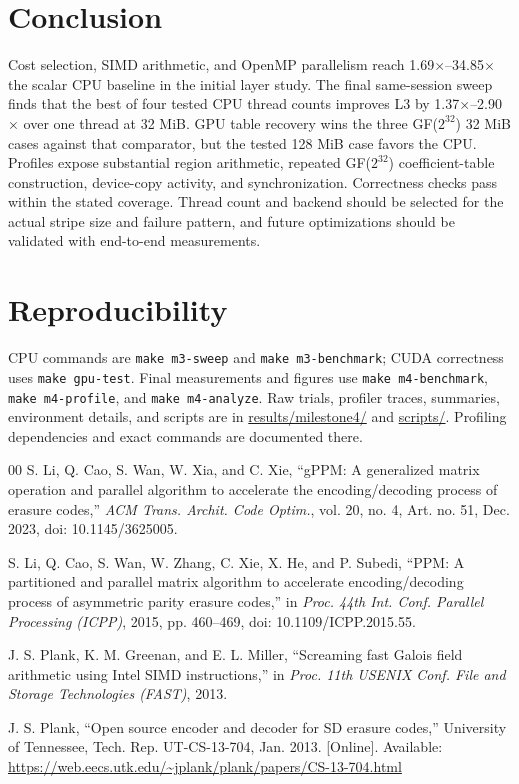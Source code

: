 \documentclass[conference]{IEEEtran}
\begin{document}
\section{Conclusion}
Cost selection, SIMD arithmetic, and OpenMP parallelism reach 1.69$\times$--34.85$\times$ the scalar CPU baseline in the initial layer study. The final same-session sweep finds that the best of four tested CPU thread counts improves L3 by 1.37$\times$--2.90$\times$ over one thread at 32 MiB. GPU table recovery wins the three GF($2^{32}$) 32 MiB cases against that comparator, but the tested 128 MiB case favors the CPU. Profiles expose substantial region arithmetic, repeated GF($2^{32}$) coefficient-table construction, device-copy activity, and synchronization. Correctness checks pass within the stated coverage. Thread count and backend should be selected for the actual stripe size and failure pattern, and future optimizations should be validated with end-to-end measurements.

\section*{Reproducibility}
\begingroup\raggedright
CPU commands are \texttt{make m3-sweep} and \texttt{make m3-benchmark}; CUDA correctness uses \texttt{make gpu-test}. Final measurements and figures use \texttt{make m4-benchmark}, \texttt{make m4-profile}, and \texttt{make m4-analyze}. Raw trials, profiler traces, summaries, environment details, and scripts are in \url{results/milestone4/} and \url{scripts/}. Profiling dependencies and exact commands are documented there.
\par\endgroup

\begin{thebibliography}{00}
S. Li, Q. Cao, S. Wan, W. Xia, and C. Xie, ``gPPM: A generalized matrix operation and parallel algorithm to accelerate the encoding/decoding process of erasure codes,'' \emph{ACM Trans. Archit. Code Optim.}, vol. 20, no. 4, Art. no. 51, Dec. 2023, doi: 10.1145/3625005.

S. Li, Q. Cao, S. Wan, W. Zhang, C. Xie, X. He, and P. Subedi, ``PPM: A partitioned and parallel matrix algorithm to accelerate encoding/decoding process of asymmetric parity erasure codes,'' in \emph{Proc. 44th Int. Conf. Parallel Processing (ICPP)}, 2015, pp. 460--469, doi: 10.1109/ICPP.2015.55.

J. S. Plank, K. M. Greenan, and E. L. Miller, ``Screaming fast Galois field arithmetic using Intel SIMD instructions,'' in \emph{Proc. 11th USENIX Conf. File and Storage Technologies (FAST)}, 2013.

J. S. Plank, ``Open source encoder and decoder for SD erasure codes,'' University of Tennessee, Tech. Rep. UT-CS-13-704, Jan. 2013. [Online]. Available: \url{https://web.eecs.utk.edu/~jplank/plank/papers/CS-13-704.html}

\end{thebibliography}
\end{document}
